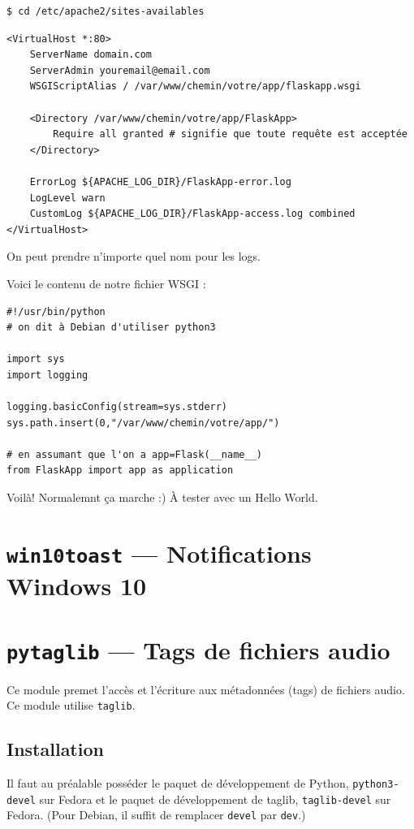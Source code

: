 \documentclass[a4paper, 10pt]{article}
\begin{document}
\begin{verbatim}
$ cd /etc/apache2/sites-availables
\end{verbatim}

\begin{verbatim}
<VirtualHost *:80>
    ServerName domain.com
    ServerAdmin youremail@email.com
    WSGIScriptAlias / /var/www/chemin/votre/app/flaskapp.wsgi

    <Directory /var/www/chemin/votre/app/FlaskApp>
        Require all granted # signifie que toute requête est acceptée
    </Directory>

    ErrorLog ${APACHE_LOG_DIR}/FlaskApp-error.log
    LogLevel warn
    CustomLog ${APACHE_LOG_DIR}/FlaskApp-access.log combined
</VirtualHost>
\end{verbatim}

On peut prendre n'importe quel nom pour les logs.

Voici le contenu de notre fichier WSGI :

\begin{verbatim}
#!/usr/bin/python
# on dit à Debian d'utiliser python3

import sys
import logging

logging.basicConfig(stream=sys.stderr)
sys.path.insert(0,"/var/www/chemin/votre/app/")

# en assumant que l'on a app=Flask(__name__)
from FlaskApp import app as application
\end{verbatim}

Voilà! Normalemnt ça marche :) À tester avec un Hello World.

\section[{\footnotesize\texttt{win10toast}} --- Notifications sous Windows 10]{{\normalfont\large\bfseries\texttt{win10toast}} --- Notifications Windows 10}


\section[{\footnotesize\texttt{pytaglib}} --- Tags de fichiers audio]{{\normalfont\large\bfseries\texttt{pytaglib}} --- Tags de fichiers audio}
Ce module premet l'accès et l'écriture aux métadonnées (tags) de fichiers audio. Ce module utilise \texttt{taglib}.

\subsection{Installation}
Il faut au préalable posséder le paquet de développement de Python, \texttt{python3-devel} sur Fedora et le paquet de développement de taglib, \texttt{taglib-devel} sur Fedora. (Pour Debian, il suffit de remplacer \texttt{devel} par \texttt{dev}.)
\end{document}
